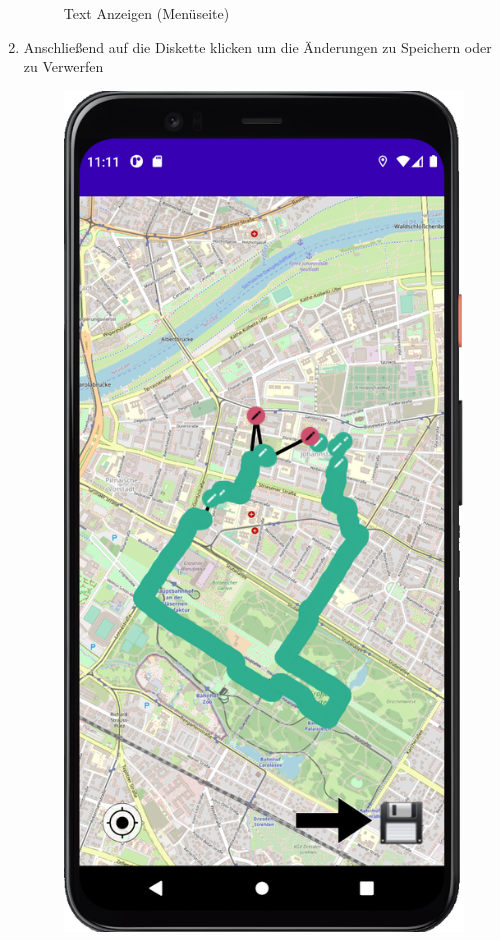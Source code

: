 \documentclass{article}
\begin{document}
\begin{enumerate}
\begin{figure}[H]
			\centering
			\caption{Text Anzeigen (Menüseite)}
	        \end{figure}
		\item Anschließend auf die Diskette klicken um die Änderungen zu Speichern oder zu Verwerfen
		\begin{figure}[H]
			\captionsetup{justification=centering}
				\includegraphics[width=\linewidth]{spoi_pic5_1.png}

\end{figure}
\end{enumerate}
\end{document}
